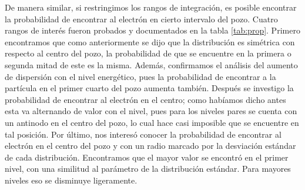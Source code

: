 \documentclass[12pt,twoside]{extarticle}
\begin{document}
\begin{table}[ht]
    \centering
    \caption{Parámetros estadísticos importantes de la función de densidad de probabilidad.}
    \label{tab:statexp}
\end{table}

De manera similar, si restringimos los rangos de integración, es posible encontrar la probabilidad de encontrar al electrón en cierto intervalo del pozo. Cuatro rangos de interés fueron probados y documentados en la tabla \ref{tab:prop}. Primero encontramos que como anteriormente se dijo que la distribución es simétrica con respecto al centro del pozo, la probabilidad de que se encuentre en la primera o segunda mitad de este es la misma. Además, confirmamos el análisis del aumento de dispersión con el nivel energético, pues la probabilidad de encontrar a la partícula en el primer cuarto del pozo aumenta también. Después se investigo la probabilidad de encontrar al electrón en el centro; como habíamos dicho antes esta va alternando de valor con el nivel, pues para los niveles pares se cuenta con un antinodo en el centro del pozo, lo cual hace casi imposible que se encuentre en tal posición. Por último, nos interesó conocer la probabilidad de encontrar al electrón en el centro del pozo y con un radio marcado por la desviación estándar de cada distribución. Encontramos que el mayor valor se encontró en el primer nivel, con una similitud al parámetro de la distribución estándar. Para mayores niveles eso se disminuye ligeramente.
\end{document}
